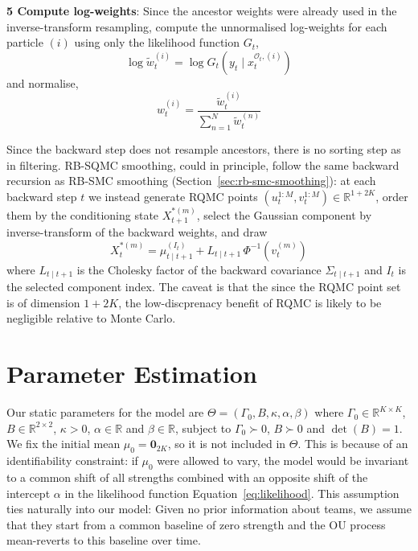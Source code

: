 \textbf{5 Compute log-weights}: Since the ancestor weights were already used in the inverse-transform resampling, compute the unnormalised log-weights for each particle $(i)$ using only the likelihood function $G_t$,
\begin{equation*}
    \log \tilde{w}_t^{(i)} = \log G_t\left( y_t \mid x_t^{\mathcal{O}_t,(i)} \right)
\end{equation*}
and normalise,
\begin{equation*}
    w_t^{(i)} = \frac{\tilde{w}_t^{(i)}}{\sum_{n=1}^N \tilde{w}_t^{(n)}}
\end{equation*}

Since the backward step does not resample ancestors, there is no sorting step as in filtering. RB-SQMC smoothing, could in principle, follow the same backward recursion as RB-SMC smoothing (Section~\ref{sec:rb-smc-smoothing}): at each backward step $t$ we instead generate RQMC points $(u_t^{1:M}, v_t^{1:M}) \in \mathbb{R}^{1 + 2K}$, order them by the conditioning state $X_{t+1}^{*(m)}$, select the Gaussian component by inverse-transform of the backward weights, and draw
\begin{equation*}
    X_t^{*(m)} = \mu_{t \mid t+1}^{(I_t)} + L_{t \mid t+1}\, \Phi^{-1}\left( v_t^{(m)} \right)
\end{equation*}
where $L_{t \mid t+1}$ is the Cholesky factor of the backward covariance $\Sigma_{t \mid t+1}$ and $I_t$ is the selected component index. The caveat is that the since the RQMC point set is of dimension $1+2K$, the low-discprenacy benefit of RQMC is likely to be negligible relative to Monte Carlo.


\section{Parameter Estimation}
\label{sec:parameter-estimation}

Our static parameters for the model are $\Theta = (\Gamma_0, B, \kappa, \alpha, \beta)$ where $\Gamma_0 \in \mathbb{R}^{K \times K}$, $B \in \mathbb{R}^{2 \times 2}$, $\kappa > 0$, $\alpha \in \mathbb{R}$ and $\beta \in \mathbb{R}$, subject to $\Gamma_0 \succ 0$, $B \succ 0$ and $\det(B) = 1$. We fix the initial mean $\mu_0 = \mathbf{0}_{2K}$, so it is not included in $\Theta$. This is because of an identifiability constraint: if $\mu_0$ were allowed to vary, the model would be invariant to a common shift of all strengths combined with an opposite shift of the intercept $\alpha$ in the likelihood function Equation~\eqref{eq:likelihood}. This assumption ties naturally into our model: Given no prior information about teams, we assume that they start from a common baseline of zero strength and the OU process mean-reverts to this baseline over time.

